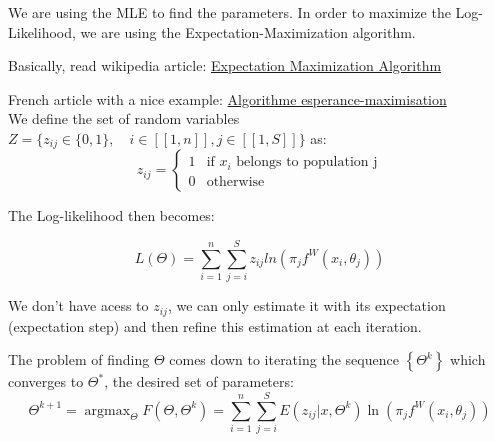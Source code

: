 \documentclass[a4paper,11pt]{article}
\DeclareMathOperator*{\argmax}{argmax}
\begin{document}
We are using the MLE to find the parameters. In order to maximize the Log-Likelihood, we are using the Expectation-Maximization algorithm.

Basically, read wikipedia article: \href{http://en.wikipedia.org/wiki/Expectation%E2%80%93maximization_algorithm}{Expectation Maximization Algorithm}

French article with a nice example: \href{http://fr.wikipedia.org/wiki/Algorithme_esp%C3%A9rance-maximisation#Exemple_d.C3.A9taill.C3.A9_:_application_en_classification_automatique}{Algorithme esperance-maximisation} \\

We define the set of random variables $Z = \{ z_{ij} \in \{0,1\} ,\quad i \in [\![1,n]\!], j \in [\![1,S]\!] \}$ as:
$$ z_{ij} = \begin{cases} 1 & \text{if $x_i$ belongs to population j} \\ 0 & \text{otherwise} \end{cases} $$ 

The Log-likelihood then becomes:

$$ L(\Theta) = \sum_{i=1}^{n} \sum_{j=i}^{S} z_{ij} ln( \pi_j f^W (x_i,\theta_j) )$$

We don't have acess to $z_{ij}$, we can only estimate it with its expectation (expectation step) and then refine this estimation at each iteration.

The problem of finding $\Theta$ comes down to iterating the sequence $\left\{ \Theta^k \right\}$ which converges to $\Theta^*$, the desired set of parameters:
$$ \Theta^{k+1} = \argmax_{\Theta} F(\Theta, \Theta^k) = \sum_{i=1}^{n} \sum_{j=i}^{S} E \left( z_{ij} | x, \Theta^k \right) \ln \left(\pi_j f^W (x_i,\theta_j)\right) $$
\end{document}
